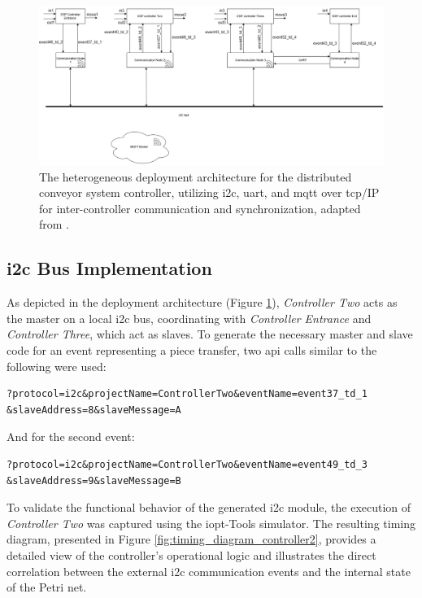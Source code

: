 \begin{figure}[htb]
    \centering
    \includegraphics[width=1\textwidth]{Chapters/Figures/prototypelayout.png}
\caption{The heterogeneous deployment architecture for the distributed conveyor system controller, utilizing \gls{i2c}, \gls{uart}, and \gls{mqtt} over \gls{tcp}/IP for inter-controller communication and synchronization, adapted from \cite{tavaresgomes2026}.}
    \label{fig:deployment_layout}
\end{figure}


\subsection{\gls{i2c} Bus Implementation}
As depicted in the deployment architecture (Figure \ref{fig:deployment_layout}), \textit{Controller Two} acts as the master on a local \gls{i2c} bus, coordinating with \textit{Controller Entrance} and \textit{Controller Three}, which act as slaves. To generate the necessary master and slave code for an event representing a piece transfer, two \gls{api} calls similar to the following were used:

\begin{verbatim}
?protocol=i2c&projectName=ControllerTwo&eventName=event37_td_1
&slaveAddress=8&slaveMessage=A
\end{verbatim}

And for the second event:
\begin{verbatim}
?protocol=i2c&projectName=ControllerTwo&eventName=event49_td_3
&slaveAddress=9&slaveMessage=B
\end{verbatim}

To validate the functional behavior of the generated \gls{i2c} module, the execution of \textit{Controller Two} was captured using the \gls{iopt}-Tools simulator. The resulting timing diagram, presented in Figure \ref{fig:timing_diagram_controller2}, provides a detailed view of the controller's operational logic and illustrates the direct correlation between the external \gls{i2c} communication events and the internal state of the Petri net.  

